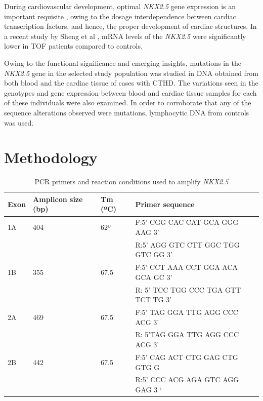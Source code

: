 \begin{refsection}
During cardiovascular development, optimal \textit{NKX2.5} gene expression is an important requisite \cite{pabst2008novel}, owing to the dosage interdependence between cardiac transcription factors, and hence, the proper development of cardiac structures. In a recent study by Sheng et al \cite{sheng2013dna}, mRNA levels of the \textit{NKX2.5} were significantly lower in TOF patients compared to controls.

Owing to the functional significance and emerging insights, mutations in the \textit{NKX2.5} gene in the selected study population was studied in DNA obtained from both blood and the cardiac tissue of cases with CTHD. The variations seen in the genotypes and gene expression between blood and cardiac tissue samples for each of these individuals were also examined. In order to corroborate that any of the sequence alterations observed were mutations, lymphocytic DNA from controls was used.

\section{Methodology}


\begin{table}[!tb]
\centering
\caption[PCR primers and reaction conditions used to amplify \textit{NKX2.5}]{PCR primers and reaction conditions used to amplify \textit{NKX2.5} \cite{goldmuntz2001nkx2}}
\label{tab:5_1}
\begin{tabular}{  P{0.5in} P{1in} P{0.5in} l }
\toprule
	\textbf{Exon} & \textbf{Amplicon size (bp)} & \textbf{Tm (ºC)}  & \textbf{Primer sequence} \\ \toprule
	1A & 404 & 62º & F:5’ CGG CAC CAT GCA GGG AAG 3’ \\ 
	 &  &  & R:5’ AGG GTC CTT GGC TGG GTC GG 3’ \\ \midrule
	1B & 355 & 67.5 & F:5’ CCT AAA CCT GGA ACA GCA GC 3’ \\ 
	 &  &  & R: 5’ TCC TGG CCC TGA GTT TCT TG  3’ \\ \midrule
	2A & 469 & 67.5 & F:5’ TAG GGA TTG AGG CCC ACG 3’ \\ 
	 &  &  & R: 5’TAG GGA TTG AGG CCC ACG 3’ \\ \midrule
	2B & 442 & 67.5 & F:5’ CAG ACT CTG GAG CTG GTG G \\ 
	 &  &  & R:5’ CCC ACG AGA GTC AGG GAG 3 ‘ \\ \bottomrule
\end{tabular}
\end{table}


\end{refsection}
